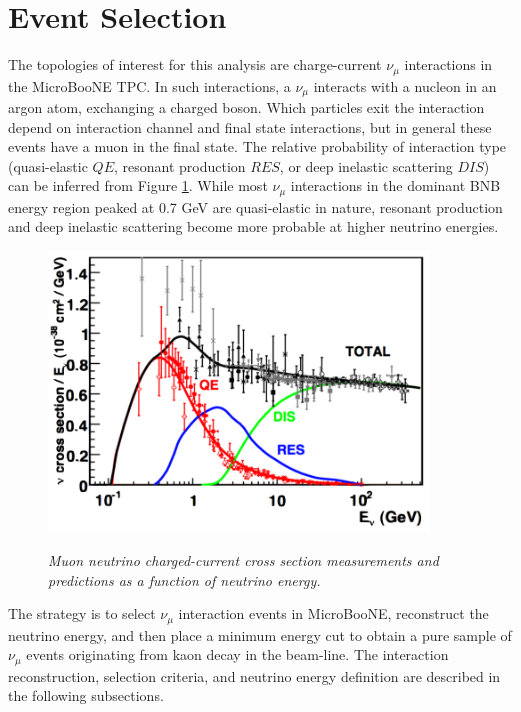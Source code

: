 \section{Event Selection}
The topologies of interest for this analysis are charge-current $\nu_\mu$ interactions in the MicroBooNE TPC. In such interactions, a $\nu_\mu$ interacts with a nucleon in an argon atom, exchanging a charged boson. Which particles exit the interaction depend on interaction channel and final state interactions, but in general these events have a muon in the final state. The relative probability of interaction type (quasi-elastic $QE$, resonant production $RES$, or deep inelastic scattering $DIS$) can be inferred from Figure \ref{bnb_xsec_breakdown_fig}. While most $\nu_\mu$ interactions in the dominant BNB energy region peaked at 0.7 GeV are quasi-elastic in nature, resonant production and deep inelastic scattering become more probable at higher neutrino energies.\\

\begin{figure}[ht!]
\centering
	\includegraphics[width=0.9\textwidth]{Figures/numu_xsec_breakdown.png} \\
\caption{\textit{Muon neutrino charged-current cross section measurements and predictions as a function of neutrino energy.}}\label{bnb_xsec_breakdown_fig}
\end{figure}

The strategy is to select $\nu_\mu$ interaction events in MicroBooNE, reconstruct the neutrino energy, and then place a minimum energy cut to obtain a pure sample of $\nu_\mu$ events originating from kaon decay in the beam-line. The interaction reconstruction, selection criteria, and neutrino energy definition are described in the following subsections.

